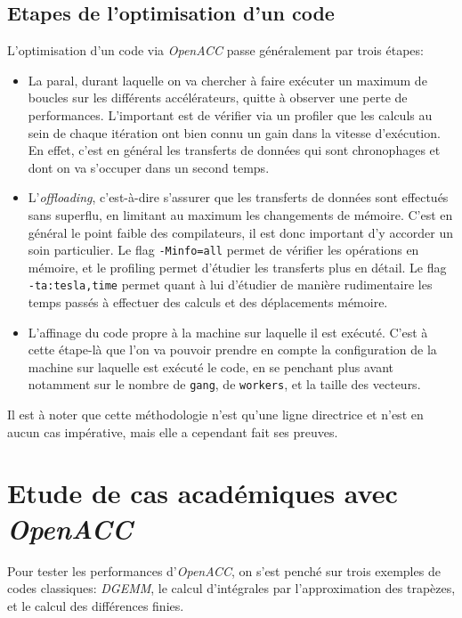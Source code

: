 \documentclass{article}
\begin{document}
\subsection{Etapes de l'optimisation d'un code}

L'optimisation d'un code via \textit{OpenACC} passe généralement par trois étapes:

\begin{itemize}
	\item La \gls{paral}, durant laquelle on va chercher à faire exécuter un maximum de boucles sur les différents accélérateurs, quitte à observer une perte de performances. L'important est de vérifier via un profiler que les calculs au sein de chaque itération ont bien connu un gain dans la vitesse d'exécution. En effet, c'est en général les transferts de données qui sont chronophages et dont on va s'occuper dans un second temps.
	\item L'\textit{offloading}, c'est-à-dire s'assurer que les transferts de données sont effectués sans superflu, en limitant au maximum les changements de mémoire. C'est en général le point faible des compilateurs, il est donc important d'y accorder un soin particulier. Le flag \texttt{-Minfo=all} permet de vérifier les opérations en mémoire, et le profiling permet d'étudier les transferts plus en détail. Le flag \texttt{-ta:tesla,time} permet quant à lui d'étudier de manière rudimentaire les temps passés à effectuer des calculs et des déplacements mémoire.
	\item L'affinage du code propre à la machine sur laquelle il est exécuté. C'est à cette étape-là que l'on va pouvoir prendre en compte la configuration de la machine sur laquelle est exécuté le code, en se penchant plus avant notamment sur le nombre de \texttt{gang}, de \texttt{workers}, et la taille des vecteurs.

\end{itemize}

Il est à noter que cette méthodologie n'est qu'une ligne directrice et n'est en aucun cas impérative, mais elle a cependant fait ses preuves.

\section{Etude de cas académiques avec \textit{OpenACC}}

Pour tester les performances d'\textit{OpenACC}, on s'est penché sur trois exemples de codes classiques: \textit{DGEMM}, le calcul d'intégrales par l'approximation des trapèzes, et le calcul des différences finies.
\end{document}
